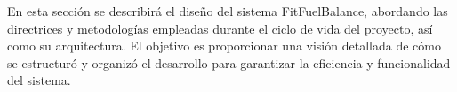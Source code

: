 En esta sección se describirá el diseño del sistema FitFuelBalance, abordando las directrices y metodologías empleadas durante el ciclo de vida del proyecto, así como su arquitectura. El objetivo es proporcionar una visión detallada de cómo se estructuró y organizó el desarrollo para garantizar la eficiencia y funcionalidad del sistema.